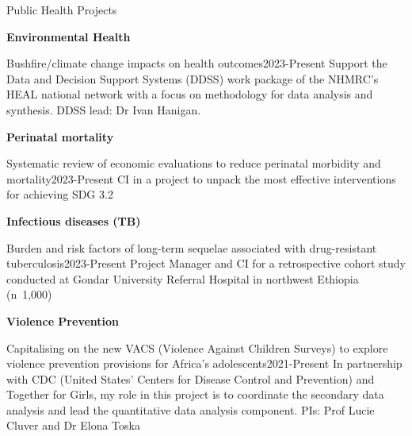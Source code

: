 \begin{rSection}{Public Health Projects}

\begin{etaremune}

\vspace{1em}

\item \textbf{Environmental Health}\par

\begin{rSubsection}
{Bushfire/climate change impacts on health outcomes}{2023-Present}
{Support the Data and Decision Support Systems (DDSS) work package of the NHMRC’s HEAL national network with a focus on methodology for data analysis and synthesis. DDSS lead: Dr Ivan Hanigan.} \par
\end{rSubsection}

\vspace{1em}

\item \textbf{Perinatal mortality}\par

\begin{rSubsection}
{Systematic review of economic evaluations to reduce perinatal morbidity and mortality}{2023-Present}
{CI in a project to unpack the most effective interventions for achieving SDG 3.2} \par
\end{rSubsection}

\vspace{1em}

\item \textbf{Infectious diseases (TB)}\par

\begin{rSubsection}
{Burden and risk factors of long-term sequelae associated with drug-resistant tuberculosis}{2023-Present}
{Project Manager and CI for a retrospective cohort study conducted at Gondar University Referral Hospital in northwest Ethiopia (n~1,000)} \par
\end{rSubsection}

\vspace{1em}

\item \textbf{Violence Prevention}\par

\begin{rSubsection}
{Capitalising on the new VACS (Violence Against Children Surveys) to explore violence prevention provisions for Africa’s adolescents}{2021-Present}
{In partnership with CDC (United States' Centers for Disease Control and Prevention) and Together for Girls, my role in this project is to coordinate the secondary data analysis and lead the quantitative data analysis component. PIs: Prof Lucie Cluver and Dr Elona Toska} \par
\end{rSubsection}


\end{etaremune}
\end{rSection}
